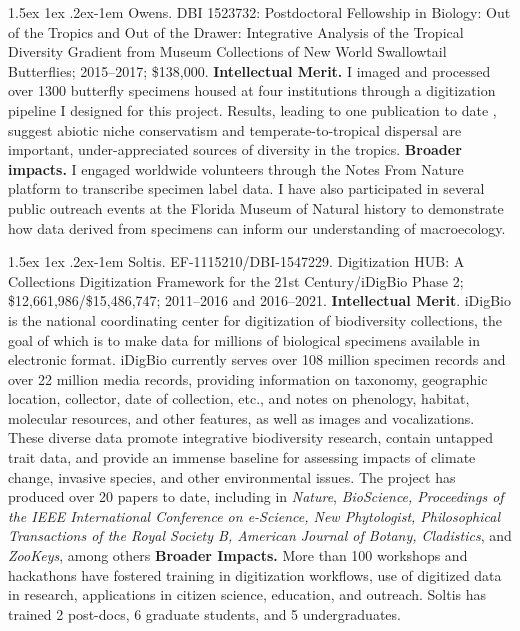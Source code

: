 \documentclass[11pt]{article}
\makeatletter
\renewcommand{\paragraph}{\@startsection{paragraph}{4}{\z@}
  {1.5ex \@plus 1ex \@minus .2ex}{-1em}
  {\normalfont\normalsize\it}
}
\makeatother
\begin{document}
\paragraph{Owens. }DBI 1523732: Postdoctoral Fellowship in Biology: Out of
the Tropics and Out of the Drawer: Integrative Analysis of the Tropical
Diversity Gradient from Museum Collections of New World Swallowtail
Butterflies; 2015--2017; \$138,000. \textbf{Intellectual Merit. }I
imaged and processed over 1300 butterfly specimens housed at four
institutions through a digitization pipeline I designed for this
project. Results, leading to one publication to date
\cite{Owens2017-ja}, suggest abiotic niche conservatism and
temperate-to-tropical dispersal are important, under-appreciated sources
of diversity in the tropics. \textbf{Broader impacts. }I engaged
worldwide volunteers through the Notes From Nature platform to
transcribe specimen label data. I have also participated in several
public outreach events at the Florida Museum of Natural history to
demonstrate how data derived from specimens can inform our understanding
of macroecology.

\paragraph{Soltis.} EF-1115210/DBI-1547229. Digitization HUB: A Collections
Digitization Framework for the 21st Century/iDigBio Phase 2;
\$12,661,986/\$15,486,747; 2011--2016 and 2016--2021.
\textbf{Intellectual Merit}. iDigBio is the national coordinating center
for digitization of biodiversity collections, the goal of which is to
make data for millions of biological specimens available in electronic
format. iDigBio currently serves over 108 million specimen records and
over 22 million media records, providing information on taxonomy,
geographic location, collector, date of collection, etc., and notes on
phenology, habitat, molecular resources, and other features, as well as
images and vocalizations. These diverse data promote integrative
biodiversity research, contain untapped trait data, and provide an
immense baseline for assessing impacts of climate change, invasive
species, and other environmental issues. The project has produced over
20 papers to date, including in \emph{Nature}, \emph{BioScience,
Proceedings of the IEEE International Conference on e-Science, New
Phytologist, Philosophical Transactions of the Royal Society B, American
Journal of Botany, Cladistics}, and \emph{ZooKeys}, among others
\textbf{Broader Impacts.} More than 100 workshops and hackathons have
fostered training in digitization workflows, use of digitized data in
research, applications in citizen science, education, and outreach.
Soltis has trained 2 post-docs, 6 graduate students, and 5
undergraduates.


\vbox{}
\end{document}
